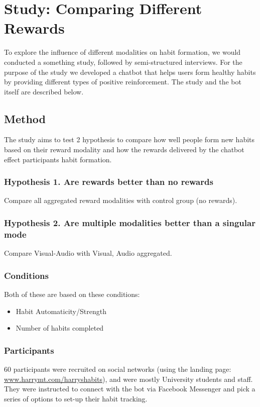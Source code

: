 \documentclass{scaffold/sigchi}
\begin{document}
\section{Study: Comparing Different Rewards}
To explore the influence of different modalities on habit formation, we would conducted a something study, followed by semi-structured interviews. For the purpose of the study we developed a chatbot that helps users form healthy habits by providing different types of positive reinforcement. The study and the bot itself are described below.



\subsection{Method}
The study aims to test 2 hypothesis to compare how well people form new habits based on their reward modality and how the rewards delivered by the chatbot effect participants habit formation.

\subsubsection{Hypothesis 1. Are rewards better than no rewards}
Compare all aggregated reward modalities with control group (no rewards).

\subsubsection{Hypothesis 2. Are multiple modalities better than a singular mode}
Compare Visual-Audio with Visual, Audio aggregated.

\subsubsection{Conditions}
Both of these are based on these conditions:
\begin{itemize}
  \item Habit Automaticity/Strength
  \item Number of habits completed
\end{itemize}



\subsubsection{Participants}
60 participants were recruited on social networks (using the landing page: \url{www.harrymt.com/harryshabits}), and were mostly University students and staff. They were instructed to connect with the bot via Facebook Messenger and pick a series of options to set-up their habit tracking.
\end{document}
